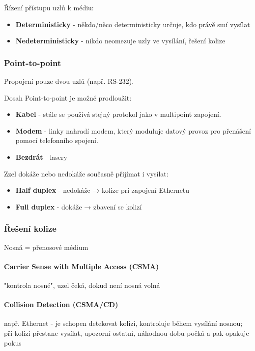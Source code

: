\documentclass[10pt,a4paper]{article}
\begin{document}
Řízení přístupu uzlů k médiu:
\begin{itemize}
    \item \textbf{Deterministicky} - někdo/něco deterministicky určuje, kdo právě smí vysílat
    \item \textbf{Nedeterministicky} - nikdo neomezuje uzly ve vysílání, řešení kolize
\end{itemize}


\subsubsection{Point-to-point}

Propojení pouze dvou uzlů (např. RS-232). 

Dosah Point-to-point je možné prodloužit:
\begin{itemize}
    \item \textbf{Kabel} - stále se používá stejný protokol jako v multipoint zapojení.
    \item \textbf{Modem} - linky nahradí modem, který moduluje datový provoz pro přenášení pomocí telefonního spojení.
    \item \textbf{Bezdrát} - lasery
\end{itemize}

Zzel dokáže nebo nedokáže současně přijímat i vysílat:
\begin{itemize}
    \item \textbf{Half duplex} - nedokáže → kolize pri zapojení Ethernetu
    \item \textbf{Full duplex} - dokáže → zbavení se kolizí
\end{itemize}

\subsubsection{Řešení kolize}

Nosná = přenosové médium

\paragraph*{Carrier Sense with Multiple Access (CSMA)} "kontrola nosné", uzel čeká, dokud není nosná volná
\paragraph*{Collision Detection (CSMA/CD)} např. Ethernet - je schopen detekovat kolizi, kontroluje během vysílání nosnou;\\při kolizi přestane vysílat, upozorní ostatní, náhodnou dobu počká a pak opakuje pokus
\end{document}
